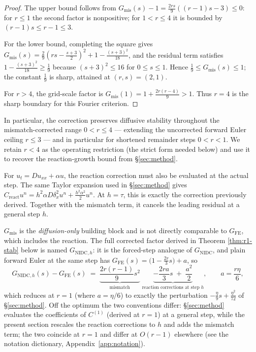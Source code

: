 \begin{proof}
The upper bound follows from
$G_{\mathrm{mis}}(s)-1
=\frac{2rs}{9}\left((r-1)s-3\right)\le0$:
for $r\le1$ the second factor is nonpositive; for $1<r\le4$ it is bounded by $(r-1)s\le r-1\le3$.

For the lower bound, completing the square gives
$G_{\mathrm{mis}}(s)
=\frac{2}{9}\left(rs-\frac{s+3}{2}\right)^2
+1-\frac{(s+3)^2}{18}$,
and the residual term satisfies $1-\frac{(s+3)^2}{18}\ge\frac19$ because $(s+3)^2\le16$ for $0\le s\le1$. Hence $\frac{1}{9}\le G_{\mathrm{mis}}(s)\le1$; the constant $\frac19$ is sharp, attained at $(r,s)=(2,1)$.

For $r>4$, the grid-scale factor is
$G_{\mathrm{mis}}(1)=1+\frac{2r(r-4)}{9}>1$.
Thus $r=4$ is the sharp boundary for this Fourier criterion.
\end{proof}

In particular, the correction preserves diffusive stability throughout the mismatch-corrected range $0<r\le4$ --- extending the uncorrected forward Euler ceiling $r\le3$ --- and in particular for shortened remainder steps $0<r<1$. We retain $r<4$ as the operating restriction (the strict form needed below) and use it to recover the reaction-growth bound from \S\ref{sec:method}.

For $u_t=Du_{xx}+\alpha u$, the reaction correction must also be evaluated at the actual step. The same Taylor expansion used in \S\ref{sec:method} gives
$C_{\mathrm{react}}u^n
=h^2\alpha D\delta_x^2u^n
+\frac{h^2\alpha^2}{2}u^n$.
At $h=\tau$, this is exactly the correction previously derived. Together with the mismatch term, it cancels the leading residual at a general step $h$.

\begin{remark}\label{rem:gfac}
$G_{\mathrm{mis}}$ is the \emph{diffusion-only} building block and is not directly comparable to $G_{\mathrm{FE}}$, which includes the reaction. The full corrected factor derived in Theorem \ref{thm:r1-stab} below is named $G_{\mathrm{NIDC},h}$: it is the forced-step analogue of $G_{\mathrm{NIDC}}$, and plain forward Euler at the same step has $G_{\mathrm{FE}}(s)=\bigl(1-\frac{2r}{3}s\bigr)+a$, so
\[
G_{\mathrm{NIDC},h}(s)-G_{\mathrm{FE}}(s)
\;=\; \underbrace{\frac{2r(r-1)}{9}s^2}_{\text{mismatch}}
\;\underbrace{-\frac{2ra}{3}s\;+\;\frac{a^2}{2}}_{\text{reaction corrections at step }h},
\qquad a=\frac{r\eta}{6},
\]
which reduces at $r=1$ (where $a=\eta/6$) to exactly the perturbation $-\frac{\eta}{9}s+\frac{\eta^2}{72}$ of \S\ref{sec:method}. Off the optimum the two conventions differ: \S\ref{sec:method} evaluates the coefficients of $C^{(1)}$ (derived at $r=1$) at a general step, while the present section rescales the reaction corrections to $h$ and adds the mismatch term; the two coincide at $r=1$ and differ at $O(r-1)$ elsewhere (see the notation dictionary, Appendix~\ref{app:notation}).
\end{remark}

